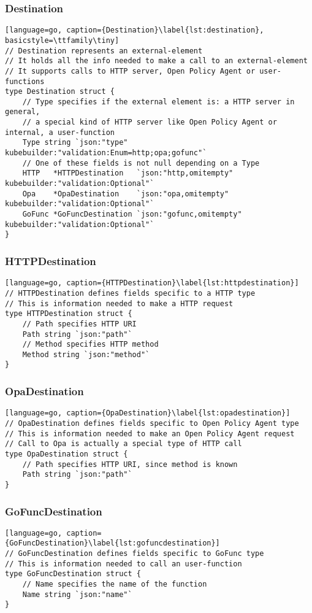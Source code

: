 \subsubsection{Destination}
\begin{lstlisting}[language=go, caption={Destination}\label{lst:destination}, basicstyle=\ttfamily\tiny]
// Destination represents an external-element
// It holds all the info needed to make a call to an external-element
// It supports calls to HTTP server, Open Policy Agent or user-functions
type Destination struct {
	// Type specifies if the external element is: a HTTP server in general, 
    // a special kind of HTTP server like Open Policy Agent or internal, a user-function
	Type string `json:"type" kubebuilder:"validation:Enum=http;opa;gofunc"`
	// One of these fields is not null depending on a Type
	HTTP   *HTTPDestination   `json:"http,omitempty" kubebuilder:"validation:Optional"`
	Opa    *OpaDestination    `json:"opa,omitempty" kubebuilder:"validation:Optional"`
	GoFunc *GoFuncDestination `json:"gofunc,omitempty" kubebuilder:"validation:Optional"`
}
\end{lstlisting}

\subsubsection{HTTPDestination}
\begin{lstlisting}[language=go, caption={HTTPDestination}\label{lst:httpdestination}]
// HTTPDestination defines fields specific to a HTTP type
// This is information needed to make a HTTP request
type HTTPDestination struct {
	// Path specifies HTTP URI
	Path string `json:"path"`
	// Method specifies HTTP method
	Method string `json:"method"`
}
\end{lstlisting}

\subsubsection{OpaDestination}
\begin{lstlisting}[language=go, caption={OpaDestination}\label{lst:opadestination}]
// OpaDestination defines fields specific to Open Policy Agent type
// This is information needed to make an Open Policy Agent request
// Call to Opa is actually a special type of HTTP call
type OpaDestination struct {
	// Path specifies HTTP URI, since method is known
	Path string `json:"path"`
}
\end{lstlisting}

\subsubsection{GoFuncDestination}
\begin{lstlisting}[language=go, caption={GoFuncDestination}\label{lst:gofuncdestination}]
// GoFuncDestination defines fields specific to GoFunc type
// This is information needed to call an user-function
type GoFuncDestination struct {
	// Name specifies the name of the function
	Name string `json:"name"`
}
\end{lstlisting}

